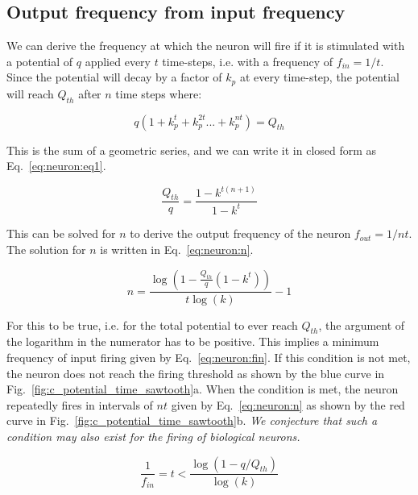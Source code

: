 \subsection{Output frequency from input frequency}

We can derive the frequency at which the neuron will fire if it is stimulated with a potential of $q$ applied every $t$ time-steps, i.e. with a frequency of $f_{in} = 1/t$. Since the potential will decay by a factor of $k_p$ at every time-step, the potential will reach $Q_{th}$ after $n$ time steps where:

\begin{equation*}
q(1 + k_p^t + k_p^{2t} ... + k_p^{nt}) = Q_{th}
\end{equation*}  

This is the sum of a geometric series, and we can write it in closed form as Eq.~\ref{eq:neuron:eq1}.

\begin{equation}
\label{eq:neuron:eq1}
\frac{Q_{th}}{q} = \frac{1-k^{t(n+1)}}{1-k^t}
\end{equation}

This can be solved for $n$ to derive the output frequency of the neuron $f_{out} = 1/nt$. The solution for $n$ is written in Eq.~\ref{eq:neuron:n}.

\begin{equation}
\label{eq:neuron:n}
n = \frac{\log(1-\frac{Q_{th}}{q}(1-k^t))}{t\log(k)}-1
\end{equation}

For this to be true, i.e. for the total potential to ever reach $Q_{th}$, the argument of the logarithm in the numerator has to be positive. This implies a minimum frequency of input firing given by Eq.~\ref{eq:neuron:fin}. If this condition is not met, the neuron does not reach the firing threshold as shown by the blue curve in Fig.~\ref{fig:c_potential_time_sawtooth}a. When the condition is met, the neuron repeatedly fires in intervals of $nt$ given by Eq.~\ref{eq:neuron:n} as shown by the red curve in Fig.~\ref{fig:c_potential_time_sawtooth}b. \textit{We conjecture that such a condition may also exist for the firing of biological neurons.}

\begin{equation}
\label{eq:neuron:fin}
\frac{1}{f_{in}} = t < \frac{\log(1-q/Q_{th})}{\log(k)}
\end{equation}

